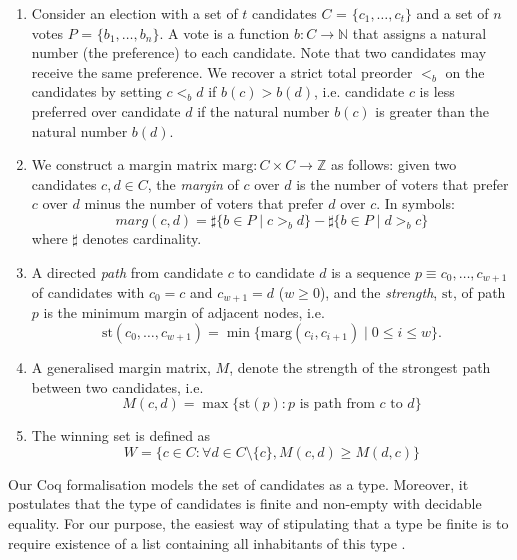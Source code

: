\documentclass[compsoc,conference,a4paper,10pt,times]{IEEEtran}
\begin{document}
\begin{enumerate}  

\item Consider an election with a set of $t$ candidates
    $C$ = $\{c_1,\dots,c_t\}$ and 
	a set of $n$ votes $P$ = $\{b_1,\dots,b_n\}$. A vote
	is a function $b: C \rightarrow \mathbb{N}$ that 
	assigns a natural 
	number (the preference) to each candidate.  Note that two
  candidates may receive the same preference. 
	We recover a strict total 
	preorder $<_b$ on the candidates by setting $c <_b d$ if $b(c) > b(d)$, i.e. 
	candidate $c$ is less preferred over candidate $d$ if the natural number $b(c)$ is greater
	than the natural number $b(d)$. 
	
\item We construct a margin matrix $\mathrm{marg} : C \times C \to \mathbb{Z}$ as follows: 
    given two candidates $c, d \in C$, the \emph{margin} of $c$ over $d$ is
    the number of voters that prefer $c$ over $d$ minus the number of voters
    that prefer $d$ over $c$. In symbols:
\[
  \mathit{marg} (c, d) = \sharp \lbrace b \in P \mid c >_b d \rbrace -
            \sharp \lbrace b \in P \mid d >_b c \rbrace
\] where $\sharp$ denotes cardinality.


\item A directed \emph{path} from
candidate $c$ to candidate $d$ is a sequence $p \equiv c_0, \dots, c_{w+1}$
of candidates with $c_0 = c$ and $c_{w+1} = d$ ($w \geq 0$), and the
\emph{strength}, $\mathrm{st}$, of path $p$ is the minimum margin of adjacent
nodes, i.e.
\[ \mathrm{st}(c_0, \dots, c_{w+1}) = \min \lbrace \mathrm{marg} (c_i, c_{i+1}) \mid 0 
\leq i \leq w \rbrace. \]
\item  A generalised margin matrix, $M$, denote the strength of the strongest path
	between two candidates, i.e. 
	\[ M(c, d) = \max \lbrace \mathrm{st} (p) : p \text{ is path from } c \text{ to } d\rbrace \]
	
\item The winning set  is defined as 
 \[ W =  \lbrace c \in C : \forall d \in C \setminus \{c\}, M (c, d) \geq M (d, c) \rbrace\]

\end{enumerate}


Our Coq formalisation models the set of candidates as a type.
Moreover, it postulates that the type of candidates 
is finite and non-empty with decidable equality. For our purpose, 
the easiest way of stipulating that a type be finite is to require existence of a 
list containing all inhabitants of this type \cite{10.1145/2808098.2808102}.
\end{document}
